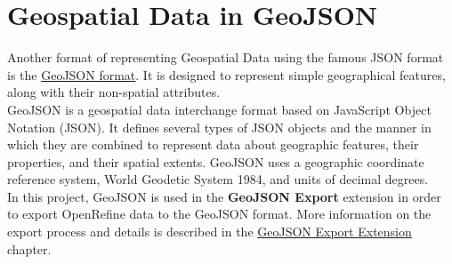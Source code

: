 \section{Geospatial Data in GeoJSON}
Another format of representing Geospatial Data using the famous JSON format is the \href{https://datatracker.ietf.org/doc/html/rfc7946}{GeoJSON format}.
It is designed to represent simple geographical features, along with their non-spatial attributes.\\
\newline
GeoJSON is a geospatial data interchange format based on JavaScript
Object Notation (JSON).  It defines several types of JSON objects and
the manner in which they are combined to represent data about
geographic features, their properties, and their spatial extents.
GeoJSON uses a geographic coordinate reference system, World Geodetic
System 1984, and units of decimal degrees.~\cite{WhatIsGeoJSON}\\
\newline
In this project, GeoJSON is used in the \textbf{GeoJSON Export} extension in order to export OpenRefine data to the
GeoJSON format. More information on the export process and details is described in the \hyperref[ch:the-geojson-export-extension]{GeoJSON Export Extension} chapter.